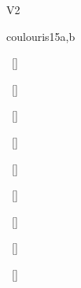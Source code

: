 \begin{syllabus}
\begin{competences}{V2}
    \item {}
    \item {}
    \item {}
    \item {}
    \item {}
    \item {}
\end{competences}

\begin{unit}{\PDDistributedSystems}{}{coulouris}{15}{a,b}
\begin{topics}%
    \item \PDDistributedSystemsTopicFaults
    \item \PDDistributedSystemsTopicDistributed
    \item \PDDistributedSystemsTopicDistributedSystem
    \item \PDDistributedSystemsTopicDistributedService
    \item \PDDistributedSystemsTopicCore
\end{topics}
\begin{learningoutcomes}%
    \item \PDDistributedSystemsLODistinguishNetwork~[\Familiarity] %
    \item \PDDistributedSystemsLOExplainWhySuch~[\Familiarity] %
    \item \PDDistributedSystemsLOWriteAPerforms~[\Usage] %
    \item \PDDistributedSystemsLOMeasure~[\Usage] %
    \item \PDDistributedSystemsLOExplainWhySystem~[\Familiarity] %
    \item \PDDistributedSystemsLOImplementAForSpell~[\Usage] %
    \item \PDDistributedSystemsLOExplainTheOverhead~[\Familiarity] %
    \item \PDDistributedSystemsLODescribeTheAssociated~[\Familiarity] %
    \item \PDDistributedSystemsLOGiveExamplesFor~[\Usage] %
\end{learningoutcomes}%
\end{unit}


\end{syllabus}
